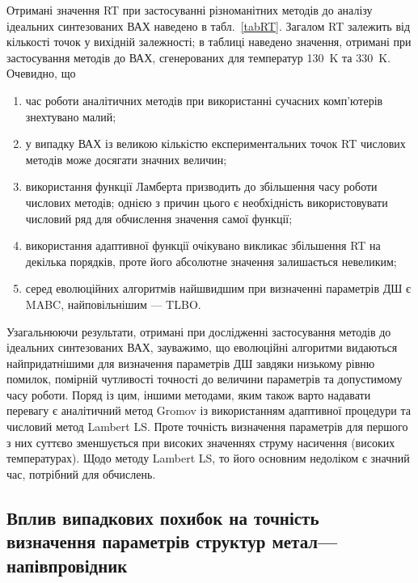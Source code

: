 Отримані значення RT при застосуванні різноманітних методів до аналізу ідеальних синтезованих ВАХ наведено в табл.~\ref{tabRT}.
Загалом RT залежить від кількості точок у вихідній залежності;
в таблиці наведено значення, отримані при застосування методів до ВАХ, сгенерованих для температур 130~K та 330~K.
Очевидно, що
\begin{enumerate}[label=\asbuk*),leftmargin=0em,itemindent=1.5em]
\item час роботи аналітичних методів при використанні сучасних комп'ютерів знехтувано малий;
\item у випадку ВАХ із великою кількістю експериментальних точок RT числових методів може досягати значних величин;
\item використання функції Ламберта призводить до збільшення часу роботи числових методів; однією з причин цього є необхідність використовувати числовий ряд для обчислення значення самої функції;
\item використання адаптивної функції очікувано викликає збільшення RT на декілька порядків, проте його абсолютне значення залишається невеликим;
\item серед еволюційних алгоритмів найшвидшим при визначенні параметрів ДШ є MABC, найповільнішим --- TLBO.
\end{enumerate}


Узагальнюючи результати, отримані при дослідженні застосування методів до ідеальних синтезованих ВАХ, зауважимо,
що еволюційні алгоритми видаються найпридатнішими для визначення параметрів ДШ завдяки низькому рівню помилок, помірній чутливості точності до величини параметрів
та допустимому часу роботи.
Поряд із цим, іншими методами, яким також варто надавати перевагу є аналітичний метод Gromov із використанням адаптивної процедури та числовий метод Lambert LS.
Проте точність визначення параметрів для першого з них суттєво зменшується при високих значеннях струму насичення (високих температурах).
Щодо методу Lambert LS, то його основним недоліком є значний час, потрібний для обчислень.


\subsection{Вплив випадкових похибок на точність визначення параметрів структур метал---напівпровідник}

